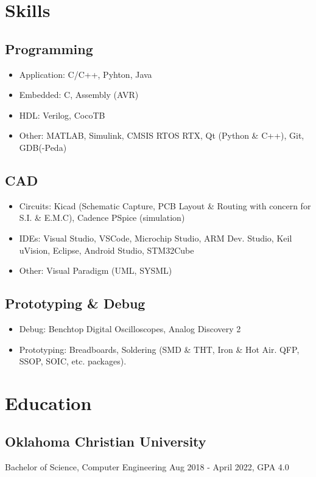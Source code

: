 \documentclass{article}
\begin{document}
\section{Skills}
	\subsection{Programming}
		\begin{itemize}
			\item Application: C/C++, Pyhton, Java
			\item Embedded: C, Assembly (AVR)
			\item HDL: Verilog, CocoTB
			\item Other: MATLAB, Simulink, CMSIS RTOS RTX, Qt (Python \& C++), Git, GDB(-Peda)
		\end{itemize}
	\subsection{CAD}
		\begin{itemize}
			\item Circuits: Kicad (Schematic Capture, PCB Layout \& Routing with concern for S.I. \& E.M.C), Cadence PSpice (simulation)
			\item IDEs: Visual Studio, VSCode, Microchip Studio, ARM Dev. Studio, Keil uVision, Eclipse, Android Studio, STM32Cube
			\item Other: Visual Paradigm (UML, SYSML)
		\end{itemize}
	\subsection{Prototyping \& Debug}
		\begin{itemize}
			\item Debug: Benchtop Digital Oscilloscopes, Analog Discovery 2
			\item Prototyping: Breadboards, Soldering (SMD \& THT, Iron \& Hot Air. QFP, SSOP, SOIC, etc. packages).
		\end{itemize}

\section{Education}
	\subsection{Oklahoma Christian University}
		Bachelor of Science, Computer Engineering Aug 2018 - April 2022, GPA 4.0
\end{document}
